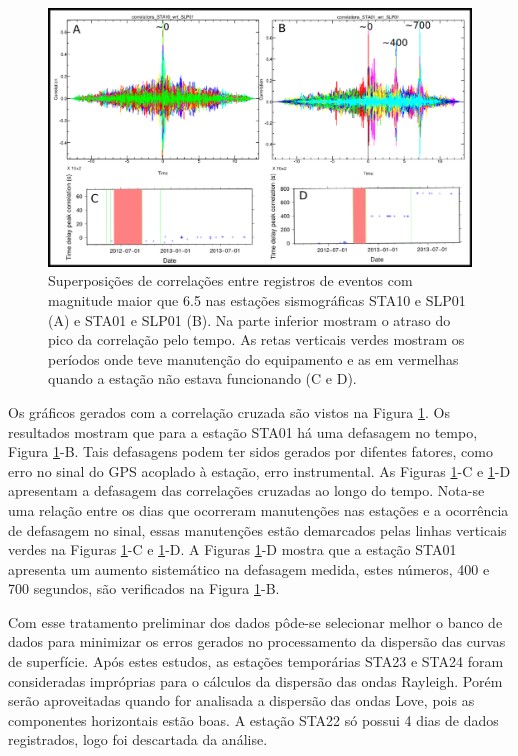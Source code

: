 \begin{figure}[!ht]
\centering
\includegraphics[scale=0.3]{Figs/correlacao_tempo_de_chegada_resultado.png}
\caption[Superposições de correlações entre registros de  eventos com magnitude maior que 6.5 nas estações sismográficas STA10 e SLP01 (A) e  STA01 e SLP01 (B)]{Superposições de correlações entre registros de  eventos com magnitude maior que 6.5 nas estações sismográficas STA10 e SLP01 (A) e  STA01 e SLP01 (B). Na parte inferior mostram o atraso do pico da correlação pelo tempo. As retas verticais verdes mostram os períodos onde teve manutenção do equipamento e as em vermelhas quando a estação não estava funcionando (C e D).}
\label{teste_tempo_results}
\end{figure}

Os gráficos gerados com a correlação cruzada são vistos na Figura \ref{teste_tempo_results}. Os resultados mostram que para a estação STA01 há uma defasagem no tempo, Figura \ref{teste_tempo_results}-B. Tais defasagens podem ter sidos gerados por difentes fatores, como erro no sinal do GPS acoplado à estação, erro instrumental. As Figuras \ref{teste_tempo_results}-C e \ref{teste_tempo_results}-D apresentam a defasagem das correlações cruzadas ao longo do tempo. Nota-se uma relação entre os  dias que ocorreram manutenções nas estações  e a ocorrência de defasagem no sinal, essas manutenções estão demarcados pelas linhas verticais verdes na Figuras \ref{teste_tempo_results}-C e \ref{teste_tempo_results}-D. A Figuras \ref{teste_tempo_results}-D mostra que a estação STA01 apresenta um aumento sistemático na defasagem medida, estes números, 400 e 700 segundos, são verificados na Figura \ref{teste_tempo_results}-B.

Com esse tratamento preliminar dos dados pôde-se selecionar melhor o banco de dados para minimizar os erros gerados no processamento da dispersão das curvas de superfície. Após estes estudos, as estações temporárias STA23 e STA24 foram consideradas impróprias para o cálculos da dispersão das ondas Rayleigh. Porém serão aproveitadas quando for analisada a dispersão das ondas Love, pois as componentes horizontais estão boas. A estação STA22 só possui 4 dias de dados registrados, logo foi descartada da análise.
